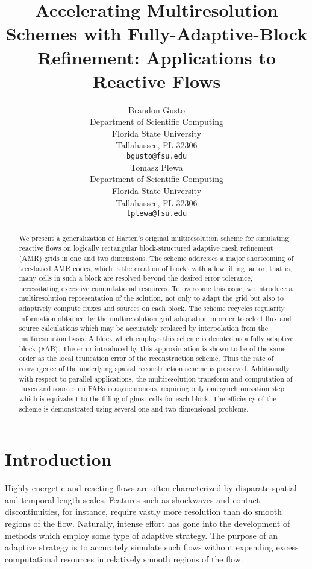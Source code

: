 \documentclass[]{article}
\title{Accelerating Multiresolution Schemes with Fully-Adaptive-Block
Refinement: Applications to Reactive Flows}
\author{
  Brandon Gusto\\
  Department of Scientific Computing\\
  Florida State University\\
  Tallahassee, FL 32306 \\
  \texttt{bgusto@fsu.edu} \\
  \And
  Tomasz Plewa \\
  Department of Scientific Computing\\
  Florida State University\\
  Tallahassee, FL 32306 \\
  \texttt{tplewa@fsu.edu} \\
}
\begin{document}
\maketitle

\begin{abstract}
    We present a generalization of Harten's original multiresolution scheme for
    simulating reactive flows on logically rectangular block-structured adaptive
    mesh refinement (AMR) grids in one and two dimensions. The scheme addresses
    a major shortcoming of tree-based AMR codes, which is the creation of blocks
    with a low filling factor; that is, many cells in such a block are resolved
    beyond the desired error tolerance, necessitating excessive computational
    resources.  To overcome this issue, we introduce a multiresolution
    representation of the solution, not only to adapt the grid but also to
    adaptively compute fluxes and sources on each block. The scheme recycles
    regularity information obtained by the multiresolution grid adaptation in
    order to select flux and source calculations which may be accurately
    replaced by interpolation from the multiresolution basis. A block which
    employs this scheme is denoted as a fully adaptive block (FAB).  The error
    introduced by this approximation is shown to be of the same order as the
    local truncation error of the reconstruction scheme. Thus the rate of
    convergence of the underlying spatial reconstruction scheme is preserved.
    Additionally with respect to parallel applications, the multiresolution
    transform and computation of fluxes and sources on FABs is asynchronous,
    requiring only one synchronization step which is equivalent to the filling
    of ghost cells for each block. The efficiency of the scheme is demonstrated
    using several one and two-dimensional problems.
\end{abstract}


\section{Introduction}

    Highly energetic and reacting flows are often characterized by disparate
    spatial and temporal length scales. Features such as shockwaves and contact
    discontinuities, for instance, require vastly more resolution than do smooth
    regions of the flow. Naturally, intense effort has gone into the development
    of methods which employ some type of adaptive strategy. The purpose of an
    adaptive strategy is to accurately simulate such flows without expending
    excess computational resources in relatively smooth regions of the flow.
\end{document}
